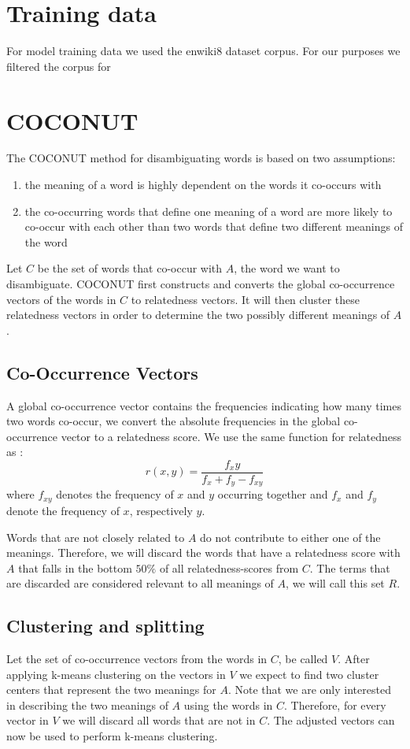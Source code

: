 \documentclass[11pt]{article}
\begin{document}
\section{Training data}
For model training data we used the enwiki8 dataset \cite{enwiki} corpus. For our purposes we filtered the corpus for 

\section{COCONUT}
The COCONUT method for disambiguating words is based on two assumptions: 
\begin{enumerate}
\item the meaning of a word is highly dependent on the words it co-occurs with
\item the co-occurring words that define one meaning of a word are more likely to co-occur with each other than two words that define two different meanings of the word
\end{enumerate}

Let $C$ be the set of words that co-occur with $A$, the word we want to disambiguate. COCONUT first constructs and converts the global co-occurrence vectors of the words in $C$ to relatedness vectors. It will then cluster these relatedness vectors in order to determine the two possibly different meanings of $A$. 

\subsection{Co-Occurrence Vectors}
A global co-occurrence vector contains the frequencies indicating how many times two words co-occur, we convert the absolute frequencies in the global co-occurrence vector to a relatedness score. We use the same function for relatedness as \cite{relatedness}:
$$r(x, y) = \frac{f_xy}{f_x+f_y - f_{xy}}$$
where $f_{xy}$ denotes the frequency of $x$ and $y$ occurring together and $f_x$ and $f_y$ denote the frequency of $x$, respectively $y$. 

Words that are not closely related to $A$ do not contribute to either one of the meanings. Therefore, we will discard the words that have a relatedness score with $A$ that falls in the bottom $50\%$ of all relatedness-scores from $C$. The terms that are discarded are considered relevant to all meanings of $A$, we will call this set $R$.

\subsection{Clustering and splitting}
Let the set of co-occurrence vectors from the words in $C$, be called $V$. After applying k-means clustering on the vectors in $V$ we expect to find two cluster centers that represent the two meanings for $A$. Note that we are only interested in describing the two meanings of $A$ using the words in $C$. Therefore, for every vector in $V$ we will discard all words that are not in $C$. The adjusted vectors can now be used to perform k-means clustering. 
\end{document}
